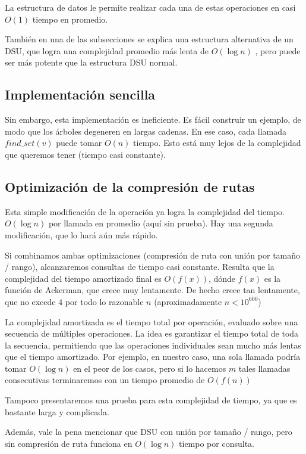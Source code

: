 La estructura de datos le permite realizar cada una de estas operaciones en casi $O(1)$ tiempo en promedio.

También en una de las subsecciones se explica una estructura alternativa de un DSU, que logra una complejidad promedio más lenta de $O(\log n)$ , pero puede ser más potente que la estructura DSU normal.

\subsection{Implementación sencilla}
Sin embargo, esta implementación es ineficiente. Es fácil construir un ejemplo, de modo que los árboles degeneren en largas cadenas. En ese caso, cada llamada $find\_set(v)$ puede tomar $O(n)$ tiempo. Esto está muy lejos de la complejidad que queremos tener (tiempo casi constante). 

\subsection{Optimización de la compresión de rutas}
Esta simple modificación de la operación ya logra la complejidad del tiempo. $O(\log n)$ por llamada en promedio (aquí sin prueba). Hay una segunda modificación, que lo hará aún más rápido.

Si combinamos ambas optimizaciones (compresión de ruta con unión por  tamaño / rango), alcanzaremos consultas de tiempo casi constante. Resulta que la complejidad del tiempo  amortizado final es $O(f(x))$, dónde $f(x)$ es la función de Ackerman, que crece muy lentamente. De hecho crece tan lentamente, que no excede $4$ por todo lo razonable $n$ (aproximadamente $n < 10^{600}$)

La complejidad amortizada es el tiempo total por operación, evaluado sobre una secuencia de múltiples operaciones. La idea es garantizar el tiempo total de toda la secuencia, permitiendo que las operaciones individuales sean mucho más lentas que el tiempo amortizado. Por ejemplo, en nuestro caso, una sola llamada podría tomar $O(\log n )$ en el peor de los casos, pero si lo hacemos $m$ tales llamadas consecutivas terminaremos con un tiempo promedio de $O(f(n))$

Tampoco presentaremos una prueba para esta complejidad de tiempo, ya que es bastante larga y complicada.

Además, vale la pena mencionar que DSU con unión por tamaño / rango, pero sin compresión de ruta funciona en $O(\log n)$ tiempo por consulta.